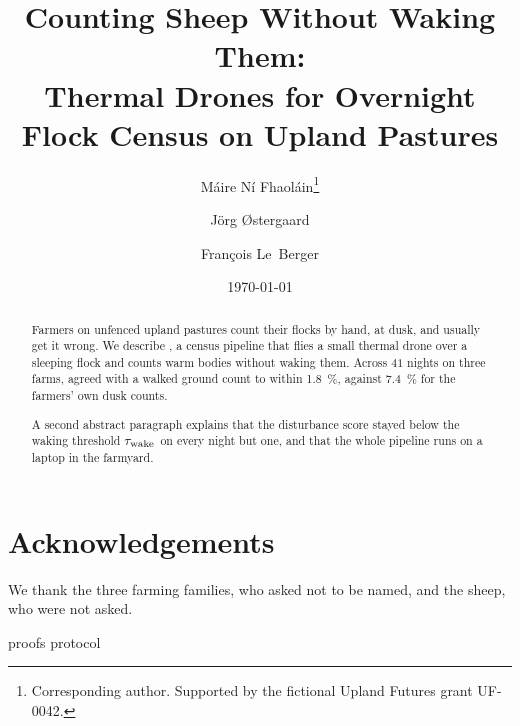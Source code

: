 \documentclass[11pt,a4paper]{article}
\title{Counting Sheep Without Waking Them:\\ Thermal Drones for Overnight Flock Census on Upland Pastures}
\author{M\'aire N\'i Fhaol\'ain\thanks{Corresponding author. Supported by the fictional Upland Futures grant UF-0042.} \and J\"org \O{}stergaard \and Fran\c{c}ois Le~Berger}
\date{\today}
\theoremstyle{definition}
\theoremstyle{remark}
\begin{document}
\maketitle

\begin{abstract}
Farmers on unfenced upland pastures count their flocks by hand, at dusk, and usually get it wrong. We describe \sys, a census pipeline that flies a small thermal drone over a sleeping flock and counts warm bodies without waking them. Across $41$ nights on three farms, \sys{} agreed with a walked ground count to within \SI{1.8}{\percent}, against \SI{7.4}{\percent} for the farmers' own dusk counts.

A second abstract paragraph explains that the disturbance score stayed below the waking threshold $\tau_{\mathrm{wake}}$ on every night but one, and that the whole pipeline runs on a laptop in the farmyard.
\end{abstract}





% 



\section*{Acknowledgements}
We thank the three farming families, who asked not to be named, and the sheep, who were not asked.

\appendix
{proofs}
{protocol}



\end{document}
